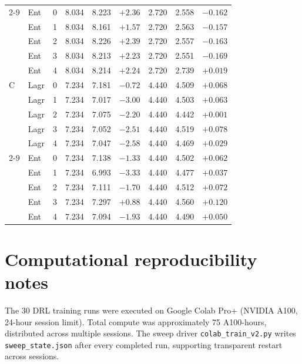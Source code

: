 \documentclass[]{interact}
\theoremstyle{plain}
\begin{document}
\begin{table}[!ht]
\begin{tabular}{llrrrrrrr}
\cmidrule{2-9}
   & Ent  & 0 & 8.034 & 8.223 & $+2.36$ & 2.720 & 2.558 & $-0.162$ \\
   & Ent  & 1 & 8.034 & 8.161 & $+1.57$ & 2.720 & 2.563 & $-0.157$ \\
   & Ent  & 2 & 8.034 & 8.226 & $+2.39$ & 2.720 & 2.557 & $-0.163$ \\
   & Ent  & 3 & 8.034 & 8.213 & $+2.23$ & 2.720 & 2.551 & $-0.169$ \\
   & Ent  & 4 & 8.034 & 8.214 & $+2.24$ & 2.720 & 2.739 & $+0.019$ \\
\midrule
C  & Lagr & 0 & 7.234 & 7.181 & $-0.72$ & 4.440 & 4.509 & $+0.068$ \\
   & Lagr & 1 & 7.234 & 7.017 & $-3.00$ & 4.440 & 4.503 & $+0.063$ \\
   & Lagr & 2 & 7.234 & 7.075 & $-2.20$ & 4.440 & 4.442 & $+0.001$ \\
   & Lagr & 3 & 7.234 & 7.052 & $-2.51$ & 4.440 & 4.519 & $+0.078$ \\
   & Lagr & 4 & 7.234 & 7.047 & $-2.58$ & 4.440 & 4.469 & $+0.029$ \\
\cmidrule{2-9}
   & Ent  & 0 & 7.234 & 7.138 & $-1.33$ & 4.440 & 4.502 & $+0.062$ \\
   & Ent  & 1 & 7.234 & 6.993 & $-3.33$ & 4.440 & 4.477 & $+0.037$ \\
   & Ent  & 2 & 7.234 & 7.111 & $-1.70$ & 4.440 & 4.512 & $+0.072$ \\
   & Ent  & 3 & 7.234 & 7.297 & $+0.88$ & 4.440 & 4.560 & $+0.120$ \\
   & Ent  & 4 & 7.234 & 7.094 & $-1.93$ & 4.440 & 4.490 & $+0.050$ \\
\bottomrule
\end{tabular}
\end{table}

\section{Computational reproducibility notes}\label{app:repro}

The 30 DRL training runs were executed on Google Colab Pro+ (NVIDIA A100, 24-hour session limit). Total compute was approximately 75 A100-hours, distributed across multiple sessions. The sweep driver \texttt{colab\_train\_v2.py} writes \texttt{sweep\_state.json} after every completed run, supporting transparent restart across sessions.
\end{document}
